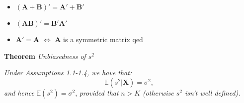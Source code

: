 \documentclass[
]{book}
\begin{document}
\begin{itemize}
\item
  \((\mathbf{A}+\mathbf{B})'=\mathbf{A}'+\mathbf{B}'\)
\item
  \((\mathbf{AB})'=\mathbf{B}'\mathbf{A}'\)
\item
  \(\mathbf{A}' =\mathbf{A}\) \(\Leftrightarrow\) \(\mathbf{A}\) is a
  symmetric matrix
  qed
\end{itemize}

\hfill\break

\textbf{Theorem} \emph{Unbiasedness of \(s^2\)}

\emph{Under Assumptions 1.1-1.4, we have that:} \[\mathbb{E}(s^2|\mathbf{X})=\sigma^2,\] \emph{and hence} \(\mathbb{E}(s^2)=\sigma^2\), \emph{provided that} \(n>K\) \emph{(otherwise \(s^2\) isn't well defined).}

\hfill\break
\end{document}
